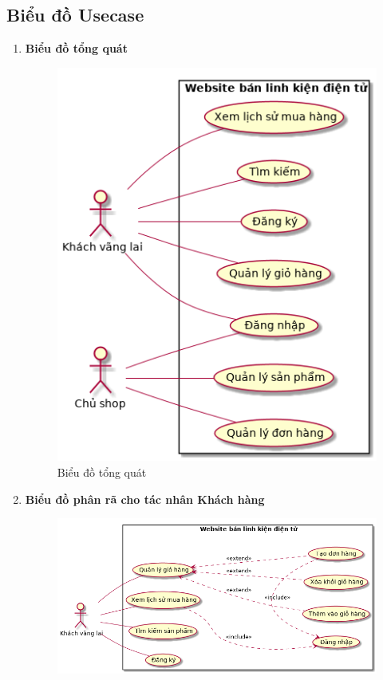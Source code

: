 \subsection{Biểu đồ Usecase}
\begin{enumerate}[label=\textbf{\alph*)}]
\item \textbf{Biểu đồ tổng quát}
    \begin{figure}[h!]
        \centering
        \includegraphics[scale=0.7]{fig/uc_all.png}
        \caption{Biểu đồ tổng quát}
    \end{figure}
\newpage
\item \textbf{Biểu đồ phân rã cho tác nhân Khách hàng}
    \begin{figure}[h!]
        \centering
        \includegraphics[scale=0.58]{fig/uc_user.png}

\end{figure}
\end{enumerate}
